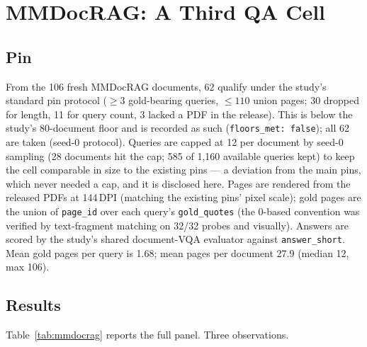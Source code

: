 \documentclass[letterpaper]{article} %
\newcommand{\lb}{\mathrm{LB}_{95}}
\begin{document}
\section{MMDocRAG: A Third QA Cell}\label{sec:mmdocrag}

\subsection{Pin}
From the 106 fresh MMDocRAG documents, 62 qualify under the study's standard pin protocol ($\geq 3$ gold-bearing queries, $\leq 110$ union pages; 30 dropped for length, 11 for query count, 3 lacked a PDF in the release). This is below the study's 80-document floor and is recorded as such (\texttt{floors\_met: false}); all 62 are taken (seed-0 protocol). Queries are capped at 12 per document by seed-0 sampling (28 documents hit the cap; 585 of 1{,}160 available queries kept) to keep the cell comparable in size to the existing pins --- a deviation from the main pins, which never needed a cap, and it is disclosed here. Pages are rendered from the released PDFs at 144\,DPI (matching the existing pins' pixel scale); gold pages are the union of \texttt{page\_id} over each query's \texttt{gold\_quotes} (the 0-based convention was verified by text-fragment matching on 32/32 probes and visually). Answers are scored by the study's shared document-VQA evaluator against \texttt{answer\_short}. Mean gold pages per query is 1.68; mean pages per document 27.9 (median 12, max 106).

\subsection{Results}

\begin{table}[t]
\centering\small
\setlength{\tabcolsep}{4pt}

\caption{The MMDocRAG cell at the 62-document fresh-documents pin, nominal 5\% budget, reader Qwen3-VL-8B (frozen stack). Contrast rows report $\Delta\,[\lb,\mathrm{UB}_{95}]$ from the document-cluster paired bootstrap. All arms are complete (4{,}680/4{,}680 rows, zero skips). Development-grade: single run, no pre-frozen bar.}
\label{tab:mmdocrag}
\end{table}

Table~\ref{tab:mmdocrag} reports the full panel. Three observations.
\end{document}
